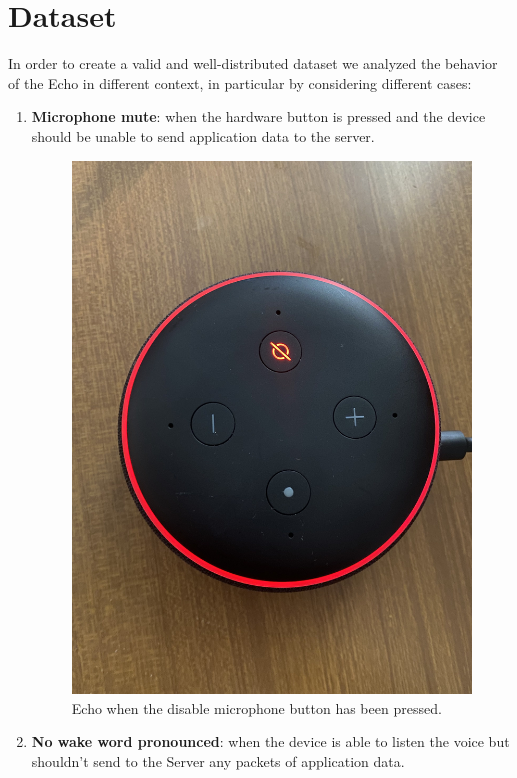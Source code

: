 \documentclass[sigconf]{acmart}
\begin{document}
    \section{Dataset}
    In order to create a valid and well-distributed dataset we analyzed the behavior of the Echo in different context, in particular by considering different cases:
    \begin{enumerate}
        \item \textbf{Microphone mute}: when the hardware button is pressed and the device should be unable to send application data to the server.
        \begin{figure}[h!]
            \includegraphics[width=\linewidth]{img/alexa_red.jpg}
            \caption{Echo when the disable microphone button has been pressed.}
            \label{fig:Alexa_red_led}
        \end{figure}
        \item \textbf{No wake word pronounced}: when the device is able to listen the voice but shouldn't send to the Server any packets of application data.

\end{enumerate}
\end{document}
